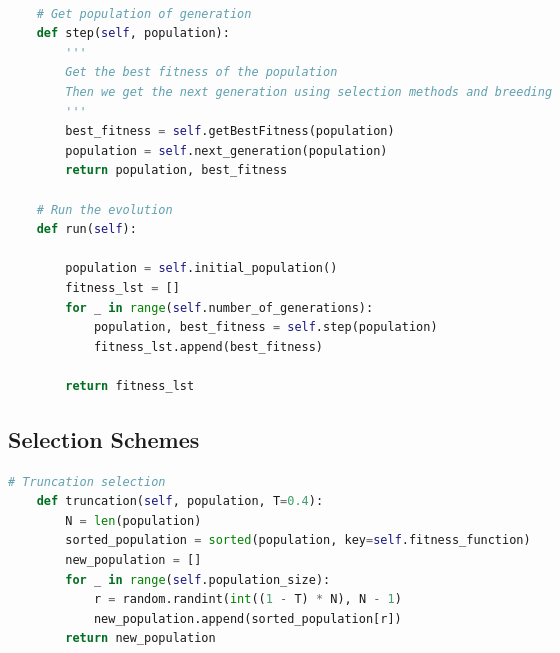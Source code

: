 \documentclass[12pt]{report} %
\begin{document}
\begin{changemargin}{-3cm}{-2cm}

	\begin{lstlisting}[language=python, caption= {Run the evolution}, captionpos=b]

    # Get population of generation
    def step(self, population):
        '''
        Get the best fitness of the population
        Then we get the next generation using selection methods and breeding
        '''
        best_fitness = self.getBestFitness(population)
        population = self.next_generation(population)
        return population, best_fitness

    # Run the evolution
    def run(self):

        population = self.initial_population()
        fitness_lst = []
        for _ in range(self.number_of_generations):
            population, best_fitness = self.step(population)
            fitness_lst.append(best_fitness)

        return fitness_lst


\end{lstlisting}
\end{changemargin}

\newpage

\subsection{Selection Schemes}



\begin{changemargin}{-3cm}{-2cm}

	\begin{lstlisting}[language=python, caption= {First the population will be sorted according to the fitness of each chromosome. Then the population will be truncated according to the truncation value. The truncation value is a value between 0 and 1. T equals 0.4 means that we will consider 60 percent of the fittest population and select random chromosomes from that 60 percent and make a new population.}, captionpos=b]
    # Truncation selection
    def truncation(self, population, T=0.4):
        N = len(population)
        sorted_population = sorted(population, key=self.fitness_function)
        new_population = []
        for _ in range(self.population_size):
            r = random.randint(int((1 - T) * N), N - 1)
            new_population.append(sorted_population[r])
        return new_population
\end{lstlisting}
\end{changemargin}
\end{document}
